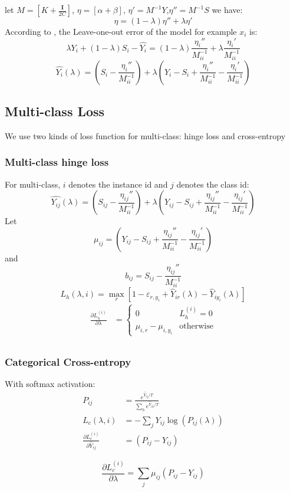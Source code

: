 let $M=[K+\frac{\mathbf{I}}{2C}]$, $\eta = [\alpha+\beta]$, $\eta'= M^{-1}Y$,$\eta''= M^{-1}S$
we have:
\[\eta = (1-\lambda)\eta''+\lambda\eta'\]
According to \cite{cawley2006leave}, the Leave-one-out error of the model for example $x_i$ is:
\[\lambda Y_i + (1-\lambda)S_i-\hat{Y_i} = (1-\lambda)\frac{\eta_i''}{M_{ii}^{-1}}+\lambda\frac{\eta_i'}{M_{ii}^{-1}}\]
\[\hat{Y_i}(\lambda) = (S_i-\frac{\eta_i''}{{M_{ii}^{-1}}})+\lambda\left(Y_i-S_i+\frac{\eta_i''}{M_{ii}^{-1}}-\frac{\eta_i'}{M_{ii}^{-1}}\right)\]
\subsection{Multi-class Loss}
We use two kinds of loss function for multi-class: hinge loss and cross-entropy
\subsubsection{Multi-class hinge loss}
For multi-class, $i$ denotes the instance id and $j$ denotes the class id:
\begin{equation}
\hat{Y_{ij}}(\lambda) = (S_{ij}-\frac{\eta_{ij}''}{{M_{ii}^{-1}}})+\lambda\left(Y_{ij}-S_{ij}+\frac{\eta_{ij}''}{M_{ii}^{-1}}-\frac{\eta_{ij}'}{M_{ii}^{-1}}\right)
\end{equation}
Let 
\[\mu_{ij} = \left(Y_{ij}-S_{ij}+\frac{\eta_{ij}''}{M_{ii}^{-1}}-\frac{\eta_{ij}'}{M_{ii}^{-1}}\right) \]
and
\[b_{ij}=S_{ij}-\frac{\eta_{ij}''}{{M_{ii}^{-1}}}\]
\begin{equation}
L_{h}\left( {\lambda ,i} \right) = \mathop {\max }\limits_r {\left[ {1 - {\varepsilon _{r,{y_i}}} + {{\hat Y}_{ir}}\left( {\lambda } \right) - {{\hat Y}_{i{y_i}}}\left( {\lambda } \right)} \right]}
\end{equation}
\begin{equation}
\begin{aligned}
\frac{\partial L_h^{(i)}}{\partial \lambda}&= 
\begin{cases}
0 & L_h^{(i)}=0\\
\mu_{i,r}-\mu_{i,y_i}& \text{otherwise}
\end{cases}\\
\end{aligned}
\end{equation}
\subsubsection{Categorical Cross-entropy}
With softmax activation:
\begin{equation}
\begin{aligned}
P_{ij} &= \frac{e^{\hat{Y}_{ij}/T}}{\sum_{h} e^{\hat{Y}_{ih}/T}}\\
L_{c}\left( {\lambda ,i} \right) &= -\sum_{j}Y_{ij}\log\left({P_{ij}}(\lambda)\right)\\
\frac{\partial L_c^{(i)}}{\partial \hat{Y}_{ij}}&=\left(P_{ij}-Y_{ij}\right)
\end{aligned}
\end{equation}

\[\frac{\partial L_c^{(i)}}{\partial \lambda}=\sum_{j}\mu_{ij}\left(P_{ij}-Y_{ij}\right)\]





